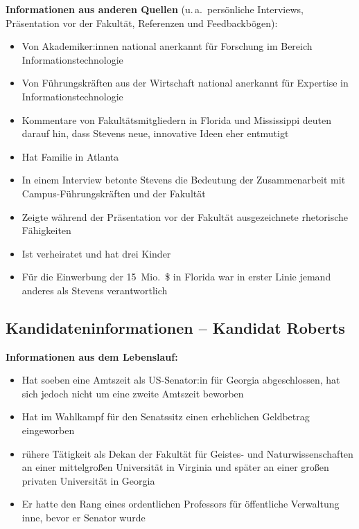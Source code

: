 \textbf{Informationen aus anderen Quellen}
(u.\,a.\ persönliche Interviews, Präsentation vor der Fakultät, Referenzen und Feedbackbögen):
\begin{itemize}
  \item Von Akademiker:innen national anerkannt für Forschung im Bereich Informationstechnologie
  \item Von Führungskräften aus der Wirtschaft national anerkannt für Expertise in Informationstechnologie
  \item Kommentare von Fakultätsmitgliedern in Florida und Mississippi deuten darauf hin, dass Stevens
    neue, innovative Ideen eher entmutigt
  \item Hat Familie in Atlanta
  \item In einem Interview betonte Stevens die Bedeutung der Zusammenarbeit mit Campus-Führungskräften
    und der Fakultät
  \item Zeigte während der Präsentation vor der Fakultät ausgezeichnete rhetorische Fähigkeiten
  \item Ist verheiratet und hat drei Kinder
  \item Für die Einwerbung der 15~Mio.\ \$ in Florida war in erster Linie jemand anderes als Stevens
    verantwortlich
\end{itemize}

\clearpage
\subsection*{Kandidateninformationen -- Kandidat Roberts}
\thispagestyle{empty}

\textbf{Informationen aus dem Lebenslauf:}
\begin{itemize}
  \item Hat soeben eine Amtszeit als US-Senator:in für Georgia abgeschlossen, hat sich jedoch nicht um
    eine zweite Amtszeit beworben
  \item Hat im Wahlkampf für den Senatssitz einen erheblichen Geldbetrag eingeworben
  \item rühere Tätigkeit als Dekan der Fakultät für Geistes- und Naturwissenschaften an
    einer mittelgroßen Universität in Virginia und später an einer großen privaten
    Universität in Georgia
  \item Er hatte den Rang eines ordentlichen Professors für öffentliche Verwaltung inne,
    bevor er Senator wurde
\end{itemize}

